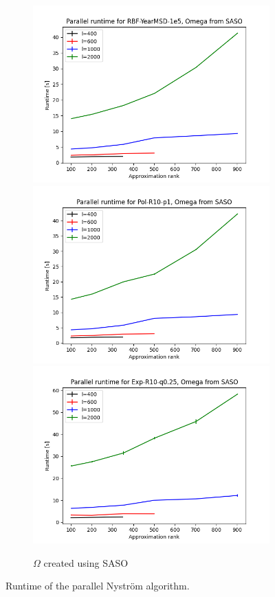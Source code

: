 \documentclass{article}
\theoremstyle{definition}
\begin{document}
\begin{figure}
\begin{subfigure}[t]{0.4\textwidth}
    \includegraphics[width=\textwidth]{plots/runtime_new/runtime_par_RBF-YearMSD-1e5_SASO.png}
    \includegraphics[width=\textwidth]{plots/runtime_new/runtime_par_Pol-R10-p1_SASO.png}
    \includegraphics[width=\textwidth]{plots/runtime_new/runtime_par_Exp-R10-q0.25_SASO.png}
    \caption{$\Omega$ created using SASO}
\end{subfigure}\hfill
\caption{Runtime of the parallel Nyström algorithm.}
\label{fig:Runtime}
\end{figure}
\end{document}
